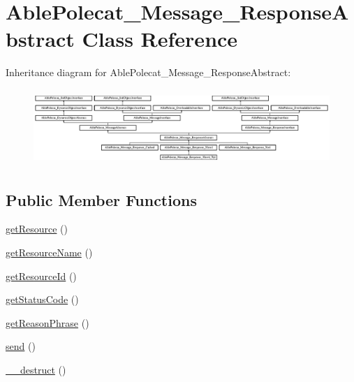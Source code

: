 \hypertarget{class_able_polecat___message___response_abstract}{}\section{Able\+Polecat\+\_\+\+Message\+\_\+\+Response\+Abstract Class Reference}
\label{class_able_polecat___message___response_abstract}
Inheritance diagram for Able\+Polecat\+\_\+\+Message\+\_\+\+Response\+Abstract\+:\begin{figure}[H]
\begin{center}
\leavevmode
\includegraphics[height=2.903704cm]{class_able_polecat___message___response_abstract}
\end{center}
\end{figure}
\subsection*{Public Member Functions}
\begin{DoxyCompactItemize}
\item 
\hyperlink{class_able_polecat___message___response_abstract_a8c5a689e9be7d35d0d01d0194637a7d2}{get\+Resource} ()
\item 
\hyperlink{class_able_polecat___message___response_abstract_a07180209c1103f29ab7e12231a62e88b}{get\+Resource\+Name} ()
\item 
\hyperlink{class_able_polecat___message___response_abstract_a0ac412173b2b1d569ef90a1ac095ca5d}{get\+Resource\+Id} ()
\item 
\hyperlink{class_able_polecat___message___response_abstract_a094778dd1c04fe44626000b47ea0c0bb}{get\+Status\+Code} ()
\item 
\hyperlink{class_able_polecat___message___response_abstract_ad2574b5790012944a05218ed095d919d}{get\+Reason\+Phrase} ()
\item 
\hyperlink{class_able_polecat___message___response_abstract_a12bcef5130168b80d3d52dc82213f19a}{send} ()
\item 
\hyperlink{class_able_polecat___message___response_abstract_a421831a265621325e1fdd19aace0c758}{\+\_\+\+\_\+destruct} ()
\end{DoxyCompactItemize}
